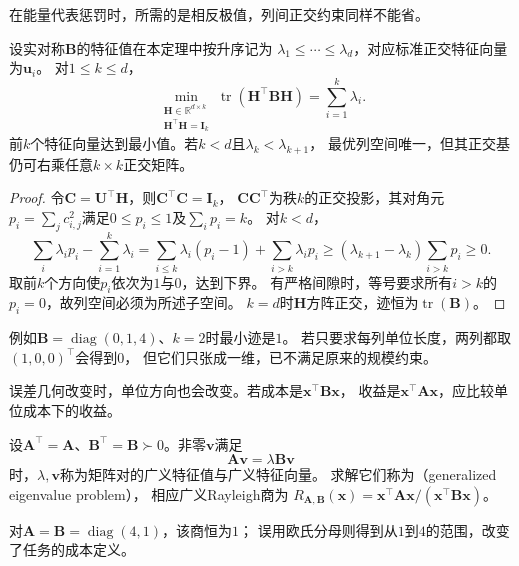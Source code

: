 在能量代表惩罚时，所需的是相反极值，列间正交约束同样不能省。
\begin{theorem}[正交列约束下的迹最小化]
\label{thm:matrix-analysis-trace-minimum}
设实对称$\bm B$的特征值在本定理中按升序记为
$\lambda_1\leq\cdots\leq\lambda_d$，对应标准正交特征向量为$\bm u_i$。
对$1\leq k\leq d$，
\begin{equation}
 \min_{\substack{\bm H\in\mathbb R^{d\times k}\\\bm H^\top\bm H=\bm I_k}}
 \operatorname{tr}(\bm H^\top\bm B\bm H)=\sum_{i=1}^k\lambda_i.
 \label{eq:matrix-analysis-trace-minimum}
\end{equation}
前$k$个特征向量达到最小值。若$k<d$且$\lambda_k<\lambda_{k+1}$，
最优列空间唯一，但其正交基仍可右乘任意$k\times k$正交矩阵。
\end{theorem}
\begin{proof}
令$\bm C=\bm U^\top\bm H$，则$\bm C^\top\bm C=\bm I_k$，
$\bm C\bm C^\top$为秩$k$的正交投影，其对角元
$p_i=\sum_j c_{i,j}^2$满足$0\leq p_i\leq1$及$\sum_i p_i=k$。
对$k<d$，
\[
 \sum_i\lambda_i p_i-\sum_{i=1}^k\lambda_i
 =\sum_{i\leq k}\lambda_i(p_i-1)+\sum_{i>k}\lambda_i p_i
 \geq(\lambda_{k+1}-\lambda_k)\sum_{i>k}p_i\geq0.
\]
取前$k$个方向使$p_i$依次为$1$与$0$，达到下界。
有严格间隙时，等号要求所有$i>k$的$p_i=0$，故列空间必须为所述子空间。
$k=d$时$\bm H$方阵正交，迹恒为$\operatorname{tr}(\bm B)$。
\end{proof}
例如$\bm B=\operatorname{diag}(0,1,4)$、$k=2$时最小迹是$1$。
若只要求每列单位长度，两列都取$(1,0,0)^\top$会得到$0$，
但它们只张成一维，已不满足原来的规模约束。

误差几何改变时，单位方向也会改变。若成本是$\bm x^\top\bm B\bm x$，
收益是$\bm x^\top\bm A\bm x$，应比较单位成本下的收益。
\begin{definition}[对称正定矩阵对的广义特征值]
\label{def:matrix-analysis-generalized-eigenvalue}
设$\bm A^\top=\bm A$、$\bm B^\top=\bm B\succ0$。非零$\bm v$满足
\begin{equation}
 \bm A\bm v=\lambda\bm B\bm v
 \label{eq:matrix-analysis-generalized-eigenproblem}
\end{equation}
时，$\lambda,\bm v$称为矩阵对的广义特征值与广义特征向量。
求解它们称为（generalized eigenvalue problem），
相应广义Rayleigh商为
$R_{\bm A,\bm B}(\bm x)=\bm x^\top\bm A\bm x/(\bm x^\top\bm B\bm x)$。
\end{definition}
对$\bm A=\bm B=\operatorname{diag}(4,1)$，该商恒为$1$；
误用欧氏分母则得到从$1$到$4$的范围，改变了任务的成本定义。

